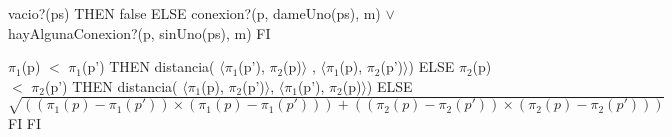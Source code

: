 \begin{tad}{}
		{\IF vacio?(ps) THEN
			false
		ELSE
			conexion?(p, dameUno(ps), m) $\lor$ hayAlgunaConexion?(p, sinUno(ps), m)
		FI}


		{\IF $\pi_1$(p) $<$ $\pi_1$(p')  THEN
			distancia( $\langle\pi_1$(p'), $\pi_2$(p)$\rangle$ , $\langle\pi_1$(p), $\pi_2$(p')$\rangle$)
		ELSE
			{\IF $\pi_2$(p) $<$ $\pi_2$(p') THEN
				distancia( $\langle\pi_1$(p), $\pi_2$(p')$\rangle$, $\langle\pi_1$(p'), $\pi_2$(p)$\rangle$)
			ELSE
				$\sqrt{((\pi_1(p) - \pi_1(p')) \times (\pi_1(p) - \pi_1(p'))) + ((\pi_2(p) - 		\pi_2(p')) \times (\pi_2(p) - \pi_2(p')))}$
			FI}
		FI}


\end{tad}